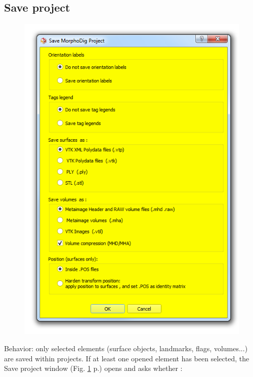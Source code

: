 \subsection{Save project}
\begin{figure}
  \centering  
 \includegraphics[scale=0.5]{images/07/project/save_ntw.png}
\label{save_project_file}
\end{figure}
Behavior: only selected elements (surface objects, landmarks, flags, volumes...) are saved within projects. If at least one opened element has been selected, the Save project window (Fig. \ref{save_project_file} p.\pageref{save_project_file}) opens and asks whether :  
